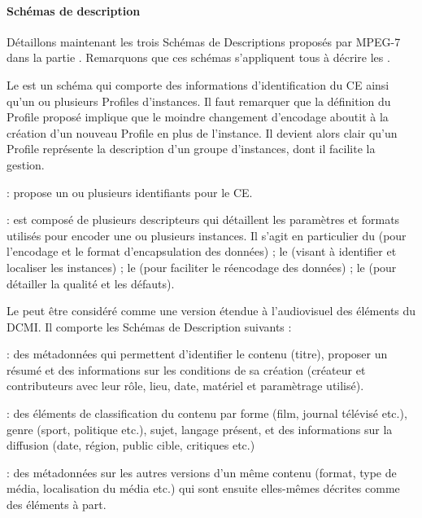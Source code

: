 \paragraph{Schémas de description}
Détaillons maintenant les trois Schémas de Descriptions proposés par MPEG-7 dans la partie .
Remarquons que ces schémas s'appliquent tous à décrire les .

Le  est un schéma qui comporte des informations d'identification du CE ainsi qu'un ou plusieurs Profiles d'instances. 
Il faut remarquer que la définition du Profile proposé implique que le moindre changement d'encodage aboutit à la création d'un nouveau Profile en plus de l'instance. 
Il devient alors clair qu'un Profile représente la description d'un groupe d'instances, dont il facilite la gestion.
\begin{liste}
	\item {} : propose un ou plusieurs identifiants pour le CE.
	\item {} : est composé de plusieurs descripteurs qui détaillent les paramètres et formats utilisés pour encoder une ou plusieurs instances.
	Il s'agit en particulier du  (pour l'encodage et le format d'encapsulation des données) ; le  (visant à identifier et localiser les instances) ; le  (pour faciliter le réencodage des données) ; le  (pour détailler la qualité et les défauts). 
\end{liste}


Le  peut être considéré comme une version étendue à l'audiovisuel des éléments du DCMI. Il comporte les Schémas de Description suivants : 
	\begin{liste}
		\item {} : des métadonnées qui permettent d'identifier le contenu (titre), proposer un résumé et des informations sur les conditions de sa création (créateur et contributeurs avec leur rôle, lieu, date, matériel et paramètrage utilisé).

		\item {} : des éléments de classification du contenu par forme (film, journal télévisé etc.), genre (sport, politique etc.), sujet, langage présent, et des informations sur la diffusion (date, région, public cible, critiques etc.)

		\item {} : des métadonnées sur les autres versions d'un même contenu (format, type de média, localisation du média etc.) qui sont ensuite elles-mêmes décrites comme des éléments à part.
	\end{liste}



